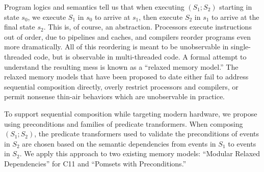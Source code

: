 
Program logics and semantics tell us that when executing $(S_1; S_2)$ starting in state $s_0$,
we execute $S_1$ in $s_0$ to arrive at $s_1$, then execute $S_2$ in $s_1$ to
arrive at the final state $s_2$.  This is, of course, an abstraction.  Processors
execute instructions out of order, due to pipelines and caches, and compilers
reorder programs even more dramatically.  All of this reordering is meant to
be unobservable in single-threaded code, but is observable in multi-threaded code.
A formal attempt to understand the resulting mess is known
as a ``relaxed memory model.''  The relaxed memory models that have been
proposed to date either fail to address sequential composition directly, overly
restrict processors and compilers, or permit nonsense thin-air behaviors which are
unobservable in practice.

To support sequential composition while targeting modern hardware, we propose
using preconditions and families of predicate transformers.  When composing
$(S_1;S_2)$, the predicate transformers used to validate the preconditions of
events in $S_2$ are chosen based on the semantic dependencies from events in
$S_1$ to events in $S_2$.  We apply this approach to two existing memory
models: ``Modular Relaxed Dependencies'' for C11 and ``Pomsets with
Preconditions.''


\endinput
